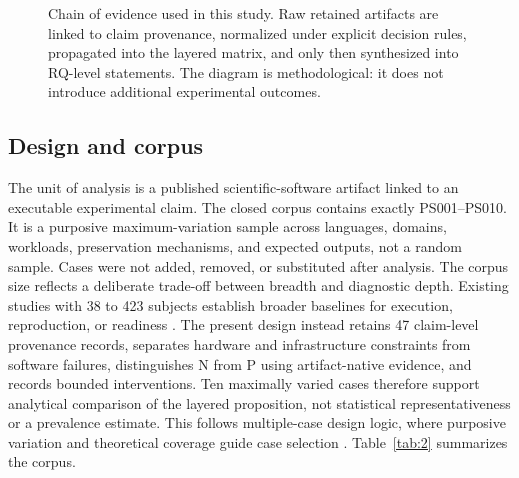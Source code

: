 \documentclass[a4paper,fleqn]{cas-dc}
\begin{document}
\begin{figure}[t]
\centering
{}
\caption{Chain of evidence used in this study. Raw retained artifacts are linked to claim provenance, normalized under explicit decision rules, propagated into the layered matrix, and only then synthesized into RQ-level statements. The diagram is methodological: it does not introduce additional experimental outcomes.}
\label{fig:evidencechain}
\end{figure}

\subsection{Design and corpus}

The unit of analysis is a published scientific-software artifact linked to an executable experimental claim. The closed corpus contains exactly PS001--PS010. It is a purposive maximum-variation sample across languages, domains, workloads, preservation mechanisms, and expected outputs, not a random sample. Cases were not added, removed, or substituted after analysis. The corpus size reflects a deliberate trade-off between breadth and diagnostic depth. Existing studies with 38 to 423 subjects establish broader baselines for execution, reproduction, or readiness \citep{muttakin2026openscience,costa2025comprep,samuel2026reproscore}. The present design instead retains 47 claim-level provenance records, separates hardware and infrastructure constraints from software failures, distinguishes N from P using artifact-native evidence, and records bounded interventions. Ten maximally varied cases therefore support analytical comparison of the layered proposition, not statistical representativeness or a prevalence estimate. This follows multiple-case design logic, where purposive variation and theoretical coverage guide case selection \citep{runeson2009guidelines}. Table~\ref{tab:2} summarizes the corpus.
\end{document}
